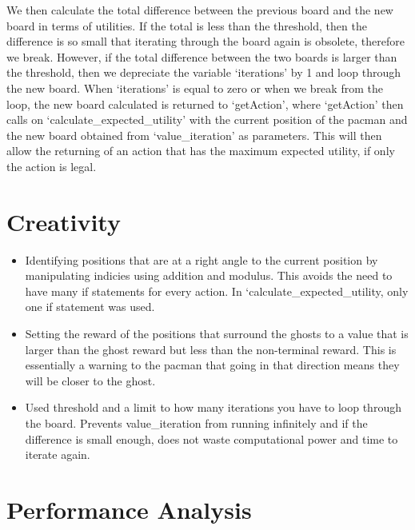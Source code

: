 \documentclass[12pt]{report}
\begin{document}
        \newline \newline
        We then calculate the total difference between the previous board and the new board in terms of utilities. If the total is less than the threshold, then the difference is so small that iterating through the board again is obsolete, therefore we break. However, if the total difference between the two boards is larger than the threshold, then we depreciate the variable `iterations' by 1 and loop through the new board. When `iterations' is equal to zero or when we break from the loop, the new board calculated is returned to `getAction', where `getAction' then calls on `calculate\_expected\_utility' with the current position of the pacman and the new board obtained from `value\_iteration' as parameters. This will then allow the returning of an action that has the maximum expected utility, if only the action is legal.

      \section*{Creativity}
        \begin{itemize}
          \item Identifying positions that are at a right angle to the current position by manipulating indicies using addition and modulus. This avoids the need to have many if statements for every action. In `calculate\_expected\_utility, only one if statement was used.
          \item Setting the reward of the positions that surround the ghosts to a value that is larger than the ghost reward but less than the non-terminal reward. This is essentially a warning to the pacman that going in that direction means they will be closer to the ghost.
          \item Used threshold and a limit to how many iterations you have to loop through the board. Prevents value\_iteration from running infinitely and if the difference is small enough, does not waste computational power and time to iterate again.
        \end{itemize}


      \section*{Performance Analysis}
\end{document}
